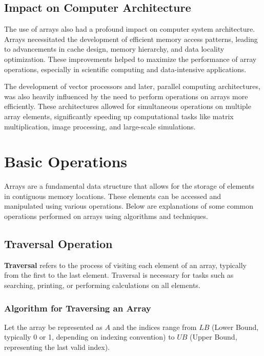 \documentclass{book}
\begin{document}
	\subsection{Impact on Computer Architecture}
	
	The use of arrays also had a profound impact on computer system architecture. Arrays necessitated the development of efficient memory access patterns, leading to advancements in cache design, memory hierarchy, and data locality optimization. These improvements helped to maximize the performance of array operations, especially in scientific computing and data-intensive applications.
	
	The development of vector processors and later, parallel computing architectures, was also heavily influenced by the need to perform operations on arrays more efficiently. These architectures allowed for simultaneous operations on multiple array elements, significantly speeding up computational tasks like matrix multiplication, image processing, and large-scale simulations.
	
	
\section{Basic Operations}

Arrays are a fundamental data structure that allows for the storage of elements in contiguous memory locations. These elements can be accessed and manipulated using various operations. Below are explanations of some common operations performed on arrays using algorithms and techniques.

\subsection{Traversal Operation}

\textbf{Traversal} refers to the process of visiting each element of an array, typically from the first to the last element. Traversal is necessary for tasks such as searching, printing, or performing calculations on all elements.

\subsubsection*{Algorithm for Traversing an Array}

Let the array be represented as $A$ and the indices range from $LB$ (Lower Bound, typically 0 or 1, depending on indexing convention) to $UB$ (Upper Bound, representing the last valid index).
\end{document}
